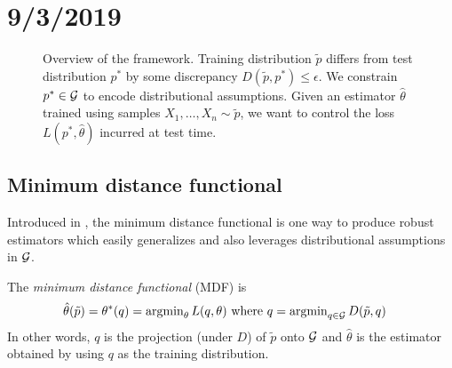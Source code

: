 \section{9/3/2019}

\begin{figure}[H]
    \centerline{
    }
    \caption{Overview of the framework. Training distribution $\tilde{p}$ differs
        from test distribution $p^*$ by some discrepancy $D(\tilde{p}, p^*) \leq \epsilon$.
        We constrain $p^* \in \mathcal{G}$ to encode distributional assumptions.
        Given an estimator $\hat\theta$ trained using samples $X_1, \ldots, X_n \sim \tilde{p}$,
        we want to control the loss $L(p^*, \hat\theta)$ incurred at test time.
    }\label{fig:robust-statistics-framework}
\end{figure}


\subsection{Minimum distance functional}

Introduced in \cite{donoho1988automatic}, the minimum distance functional is one way to
produce robust estimators which easily generalizes and also leverages distributional assumptions
in $\mathcal{G}$.

\begin{definition}\label{def:mdf}
    The \emph{minimum distance functional} (MDF) is
    \begin{align}
        \hat\theta(\tilde{p}) &= \theta^*(q) = \operatorname{argmin}_{\theta} L(q, \theta)
        \text{ where }
        q = \operatorname{argmin}_{q \in \mathcal{G}} D(\tilde{p}, q)
    \end{align}
    In other words, $q$ is the projection (under $D$) of $\tilde{p}$ onto $\mathcal{G}$
    and $\hat\theta$ is the estimator obtained by using $q$ as the training distribution.
\end{definition}

